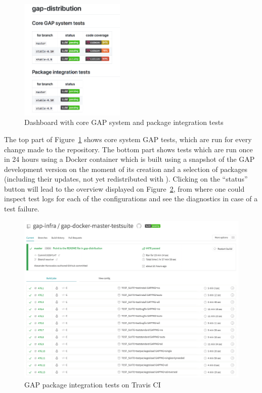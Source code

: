 \documentclass{deliverablereport}
\begin{document}
\begin{figure}[!ht]
    \centering
    \includegraphics[width=5cm]{images/gap-core-tests}
    \caption{Dashboard with core GAP system and package integration tests}
    \label{fig:gap-core-tests}
\end{figure}

The top part of Figure~\ref{fig:gap-core-tests} shows core system GAP tests,
which are run for every change made to the repository. The bottom part shows
tests which are run once in 24 hours using a Docker container which is built
using a snapshot of the GAP development version on the moment of its creation
and a selection of \GAP packages (including their updates, not yet redistributed
with \GAP). Clicking on the ``status'' button will lead to the overview displayed
on Figure~\ref{fig:gap-docker-master-testsuite}, from where one could inspect
test logs for each of the configurations and see the diagnostics in case of a
test failure.

\begin{figure}[!ht]
    \centering
    \includegraphics[width=\textwidth]{images/gap-docker-master-testsuite}
    \caption{GAP package integration tests on Travis CI}
    \label{fig:gap-docker-master-testsuite}
\end{figure}
\end{document}
